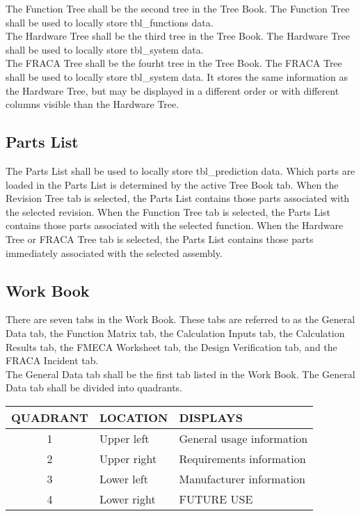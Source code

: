 \documentclass[11pt, 12pt, twoside, onecolumn]{article}
\begin{document}
\noindent The Function Tree shall be the second tree in the Tree Book.  The Function Tree shall be used to locally store tbl\_functions data. \\

\noindent The Hardware Tree shall be the third tree in the Tree Book.  The Hardware Tree shall be used to locally store tbl\_system data. \\

\noindent The FRACA Tree shall be the fourht tree in the Tree Book.  The FRACA Tree shall be used to locally store tbl\_system data.  It stores the same information as the Hardware Tree, but may be displayed in a different order or with different columns visible than the Hardware Tree. \\

\subsection{\bf \large Parts List}

\noindent The Parts List shall be used to locally store tbl\_prediction data.  Which parts are loaded in the Parts List is determined by the active Tree Book tab.  When the Revision Tree tab is selected, the Parts List contains those parts associated with the selected revision.  When the Function Tree tab is selected, the Parts List contains those parts associated with the selected function.  When the Hardware Tree or FRACA Tree tab is selected, the Parts List contains those parts immediately associated with the selected assembly. \\

\subsection{\bf \large Work Book}

\noindent There are seven tabs in the Work Book.  These tabs are referred to as the General Data tab, the Function Matrix tab, the Calculation Inputs tab, the Calculation Results tab, the FMECA Worksheet tab, the Design Verification tab, and the FRACA Incident tab. \\

\noindent The General Data tab shall be the first tab listed in the Work Book.  The General Data tab shall be divided into quadrants. \\

    \begin{longtable}{cll}
    QUADRANT & LOCATION & DISPLAYS \\
    \hline
    1 & Upper left & General usage information \\
    2 & Upper right & Requirements information \\
    3 & Lower left & Manufacturer information \\
    4 & Lower right & FUTURE USE \\
    \hline
    \end{longtable}
\end{document}
